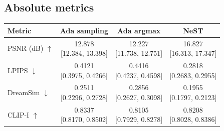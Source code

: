 \documentclass[11pt,letterpaper]{article}
\begin{document}
\subsection*{Absolute metrics}
\begin{center}\small\setlength{\tabcolsep}{12pt}\renewcommand{\arraystretch}{1.55}
\begin{tabular}{lccc}
\toprule
Metric & Ada sampling & Ada argmax & NeST\\\midrule
PSNR (dB) $\uparrow$ & \shortstack{12.878\\{}[12.384, 13.398]} & \shortstack{12.227\\{}[11.738, 12.751]} & \shortstack{16.827\\{}[16.313, 17.347]}\\
LPIPS $\downarrow$ & \shortstack{0.4121\\{}[0.3975, 0.4266]} & \shortstack{0.4416\\{}[0.4237, 0.4598]} & \shortstack{0.2818\\{}[0.2683, 0.2955]}\\
DreamSim $\downarrow$ & \shortstack{0.2511\\{}[0.2296, 0.2728]} & \shortstack{0.2856\\{}[0.2627, 0.3098]} & \shortstack{0.1955\\{}[0.1797, 0.2123]}\\
CLIP-I $\uparrow$ & \shortstack{0.8337\\{}[0.8170, 0.8502]} & \shortstack{0.8105\\{}[0.7929, 0.8278]} & \shortstack{0.8208\\{}[0.8028, 0.8386]}\\
\bottomrule\end{tabular}\end{center}
\end{document}
